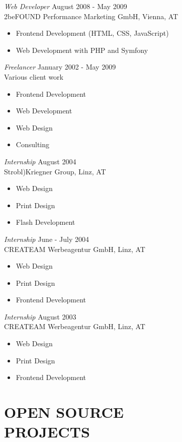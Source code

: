 \documentclass[margin]{res}
\begin{document}
\begin{resume}
{\sl Web Developer} \hfill August 2008 - May 2009 \\
	2beFOUND Performance Marketing GmbH, Vienna, AT
	\begin{itemize}  \itemsep -2pt
		\item Frontend Development (HTML, CSS, JavaScript)
		\item Web Development with PHP and Symfony
	\end{itemize}

{\sl Freelancer} \hfill January 2002 - May 2009 \\
	Various client work
	\begin{itemize}  \itemsep -2pt
		\item Frontend Development
		\item Web Development
		\item Web Design
		\item Consulting
	\end{itemize}

{\sl Internship} \hfill August 2004 \\
	Strobl)Kriegner Group, Linz, AT
	\begin{itemize}  \itemsep -2pt
		\item Web Design
		\item Print Design
		\item Flash Development
	\end{itemize}

{\sl Internship} \hfill June - July 2004 \\
	CREATEAM Werbeagentur GmbH, Linz, AT
	\begin{itemize}  \itemsep -2pt
		\item Web Design
		\item Print Design
		\item Frontend Development
	\end{itemize}

{\sl Internship} \hfill August 2003 \\
	CREATEAM Werbeagentur GmbH, Linz, AT
	\begin{itemize}  \itemsep -2pt
		\item Web Design
		\item Print Design
		\item Frontend Development
	\end{itemize}

\section{OPEN SOURCE \\ PROJECTS}


\end{resume}
\end{document}
